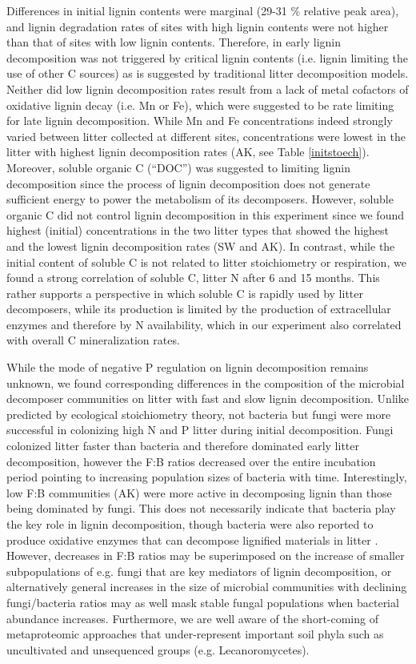 Differences in initial lignin contents were marginal (29-31 \% relative peak area), and lignin degradation rates of sites with high lignin contents were not higher than that of sites with low lignin contents. Therefore, in early lignin decomposition was not triggered by critical lignin contents (i.e. lignin limiting the use of other C sources) as is suggested by traditional litter decomposition models. Neither did low lignin decomposition rates result from a lack of metal cofactors of oxidative lignin decay (i.e. Mn or Fe), which were suggested to be rate limiting for late lignin decomposition\cite{Berg2008}. While Mn and Fe concentrations indeed strongly varied between litter collected at different sites, concentrations were lowest in the litter with highest lignin decomposition rates (AK, see Table \ref{initstoech}). Moreover, soluble organic C (``DOC'') was suggested to limiting lignin decomposition since the process of lignin decomposition does not generate sufficient energy to power the metabolism of its decomposers\cite{Klotzbucher2011}. However, soluble organic C  did not control lignin decomposition in this experiment since we found highest (initial) concentrations in the two litter types that showed the highest and the lowest lignin decomposition rates (SW and AK). In contrast, while the initial content of soluble C is not related to litter stoichiometry or respiration, we found a strong correlation of soluble C, litter N after 6 and 15 months. This rather supports a perspective in which soluble C is rapidly used by litter decomposers, while its production is limited by the production of extracellular enzymes and therefore by N availability, which in our experiment also correlated with overall C mineralization rates.

While the mode of negative P regulation on lignin decomposition remains unknown, we found corresponding differences in the composition of the microbial decomposer communities on litter with fast and slow lignin decomposition. Unlike predicted by ecological stoichiometry theory, not bacteria but fungi were more successful in colonizing high N and P litter during initial decomposition. Fungi colonized litter faster than bacteria and therefore dominated early litter decomposition, however the F:B ratios decreased over the entire incubation period pointing to increasing population sizes of bacteria with time. Interestingly, low F:B communities (AK) were more active in decomposing lignin than those being dominated by fungi. This does not necessarily indicate that bacteria play the key role in lignin decomposition, though bacteria were also reported to produce oxidative enzymes that can decompose lignified materials in litter \cite{Bugg2011}. However, decreases in F:B ratios may be superimposed on the increase of smaller subpopulations of e.g. fungi that are key mediators of lignin decomposition, or alternatively general increases in the size of microbial communities with declining fungi/bacteria ratios may as well mask stable fungal populations when  bacterial abundance increases. Furthermore, we are well aware of the short-coming of metaproteomic approaches that under-represent important soil phyla such as uncultivated and unsequenced groups (e.g. Lecanoromycetes). 

